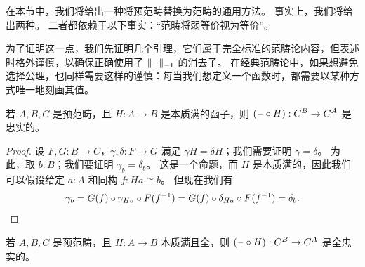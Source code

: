 在本节中，我们将给出一种将预范畴替换为范畴的通用方法。
事实上，我们将给出两种。
二者都依赖于以下事实：``范畴将弱等价视为等价''。

为了证明这一点，我们先证明几个引理，它们属于完全标准的范畴论内容，但表述时格外谨慎，以确保正确使用了 $\Vert \mathord{\hspace{1pt}\text{--}\hspace{1pt}} \Vert_{-1}$ 的消去子。
在经典范畴论中，如果想避免选择公理，也同样需要这样的谨慎：每当我们想定义一个函数时，都需要以某种方式唯一地刻画其值。

\begin{lem}\label{ct:esosurj-postcomp-faithful}
  若 $A,B,C$ 是预范畴，且 $H:A\to B$ 是本质满的函子，则 $(\mathord{\hspace{1pt}\text{--}\hspace{1pt}}\circ H):C^B \to C^A$ 是忠实的。
\end{lem}

\begin{proof}
  设 $F,G:B\to C$，$\gamma,\delta:F\to G$ 满足 $\gamma H = \delta H$；我们需要证明 $\gamma=\delta$。
  为此，取 $b:B$；我们要证明 $\gamma_b=\delta_b$。
  这是一个命题，而 $H$ 是本质满的，因此我们可以假设给定 $a:A$ 和同构 $f:Ha\cong b$。
  但现在我们有
  \[ \gamma_b = G(f) \circ \gamma_{Ha} \circ F({f}^{-1})
  = G(f) \circ \delta_{Ha} \circ F({f}^{-1})
  = \delta_b.\qedhere
  \]
\end{proof}

\begin{lem}\label{ct:esofull-precomp-ff}
  若 $A,B,C$ 是预范畴，且 $H:A\to B$ 本质满且全，则 $(\mathord{\hspace{1pt}\text{--}\hspace{1pt}}\circ H):C^B \to C^A$ 是全忠实的。
\end{lem}

